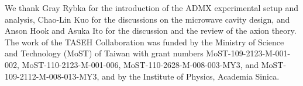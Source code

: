 \documentclass[%
preprint, %
 amsmath,amssymb,
 aps,
]{revtex4-2}
\begin{document}
\maketitle

\tableofcontents %









\begin{acknowledgments}
We thank Gray Rybka for the introduction of the ADMX experimental 
setup and analysis, Chao-Lin Kuo for the discussions on the microwave cavity 
design, and Anson Hook and Asuka Ito 
for the discussion and the review of the axion 
theory. The work of the TASEH Collaboration was funded by 
the Ministry of Science and Technology (MoST) of Taiwan with grant numbers 
MoST-109-2123-M-001-002, MoST-110-2123-M-001-006, MoST-110-2628-M-008-003-MY3,
and MoST-109-2112-M-008-013-MY3, and by the Institute of Physics, Academia 
Sinica. 

\end{acknowledgments}

\appendix



\end{document}
